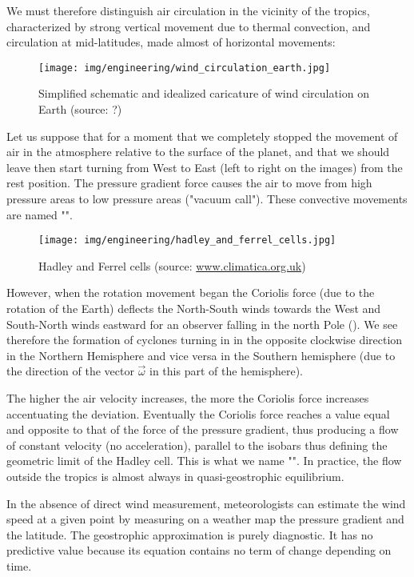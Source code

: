 	We must therefore distinguish air circulation in the vicinity of the tropics, characterized by strong vertical movement due to thermal convection, and circulation at mid-latitudes, made almost of horizontal movements:
	\begin{figure}[H]
		\begin{center}
			\texttt{[image: img/engineering/wind\_circulation\_earth.jpg]}
		\end{center}	
		\caption[]{Simplified schematic and idealized caricature of wind circulation on Earth (source: ?)}
	\end{figure}
	Let us suppose that for a moment that we completely stopped the movement of air in the atmosphere relative to the surface of the planet, and that we should leave then start turning from West to East (left to right on the images) from the rest position. The pressure gradient force causes the air to move from high pressure areas to low pressure areas ("vacuum call"). These convective movements are named "".
	\begin{figure}[H]
		\begin{center}
			\texttt{[image: img/engineering/hadley\_and\_ferrel\_cells.jpg]}
		\end{center}	
		\caption[]{Hadley and Ferrel cells (source: \url{www.climatica.org.uk})}
	\end{figure}
	However, when the rotation movement began the Coriolis force (due to the rotation of the Earth) deflects the North-South winds towards the West and South-North winds eastward for an observer falling in the north Pole (). We see therefore the formation of cyclones turning in in the opposite clockwise direction  in the Northern Hemisphere and vice versa in the Southern hemisphere (due to the direction of the vector $\vec{\omega}$ in this part of the hemisphere).
	
	The higher the air velocity increases, the more the Coriolis force increases accentuating the deviation. Eventually the Coriolis force reaches a value equal and opposite to that of the force of the pressure gradient, thus producing a flow of constant velocity (no acceleration), parallel to the isobars thus defining the geometric limit of the Hadley cell. This is what we name "". In practice, the flow outside the tropics is almost always in quasi-geostrophic equilibrium.

	In the absence of direct wind measurement, meteorologists can estimate the wind speed at a given point by measuring on a weather map the pressure gradient and the latitude. The geostrophic approximation is purely diagnostic. It has no predictive value because its equation contains no term of change depending on time.
	
